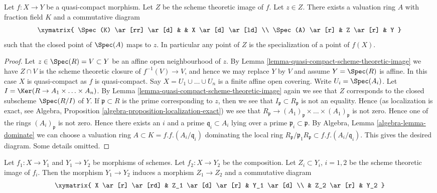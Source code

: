 \begin{lemma}
\label{lemma-reach-points-scheme-theoretic-image}
Let $f : X \to Y$ be a quasi-compact morphism.
Let $Z$ be the scheme theoretic image of $f$.
Let $z \in Z$. There exists a valuation ring $A$ with
fraction field $K$ and a commutative diagram
$$
\xymatrix{
\Spec(K) \ar[rr] \ar[d] & & X \ar[d] \ar[ld] \\
\Spec(A) \ar[r] & Z \ar[r] & Y
}
$$
such that the closed point of $\Spec(A)$ maps to $z$. In particular
any point of $Z$ is the specialization of a point of $f(X)$.
\end{lemma}

\begin{proof}
Let $z \in \Spec(R) = V \subset Y$ be an affine open
neighbourhood of $z$. By
Lemma \ref{lemma-quasi-compact-scheme-theoretic-image}
we have $Z \cap V$ is the scheme theoretic closure of
$f^{-1}(V) \to V$, and hence we may replace $Y$ by $V$
and assume $Y = \Spec(R)$ is affine.
In this case $X$ is quasi-compact as $f$ is quasi-compact.
Say $X = U_1 \cup \ldots \cup U_n$
is a finite affine open covering. Write $U_i = \Spec(A_i)$.
Let $I = \Ker(R \to A_1 \times \ldots \times A_n)$.
By Lemma \ref{lemma-quasi-compact-scheme-theoretic-image}
again we see that $Z$ corresponds to the closed subscheme
$\Spec(R/I)$ of $Y$. If $\mathfrak p \subset R$ is
the prime corresponding to $z$, then we see that
$I_{\mathfrak p} \subset R_{\mathfrak p}$ is not an
equality. Hence (as localization is exact, see
Algebra, Proposition \ref{algebra-proposition-localization-exact})
we see that
$R_{\mathfrak p} \to
(A_1)_{\mathfrak p} \times \ldots \times (A_1)_{\mathfrak p}$
is not zero. Hence one of the rings $(A_i)_{\mathfrak p}$ is not zero.
Hence there exists an $i$ and a prime $\mathfrak q_i \subset A_i$
lying over a prime $\mathfrak p_i \subset \mathfrak p$.
By Algebra, Lemma \ref{algebra-lemma-dominate} we can choose a valuation ring
$A \subset K = f.f.(A_i/\mathfrak q_i)$ dominating
the local ring
$R_{\mathfrak p}/\mathfrak p_1R_{\mathfrak p} \subset f.f.(A_i/\mathfrak q_i)$.
This gives the desired diagram. Some details omitted.
\end{proof}


\begin{lemma}
\label{lemma-factor-factor}
Let $f_1 : X \to Y_1$ and $Y_1 \to Y_2$ be morphisms of schemes.
Let $f_2 : X \to Y_2$ be the composition. Let $Z_i \subset Y_i$, $i = 1, 2$ be
the scheme theoretic image of $f_i$. Then the morphism
$Y_1 \to Y_2$ induces a morphism $Z_1 \to Z_2$ and a
commutative diagram
$$
\xymatrix{
X \ar[r] \ar[rd] & Z_1 \ar[d] \ar[r] & Y_1 \ar[d] \\
& Z_2 \ar[r] & Y_2
}
$$
\end{lemma}

